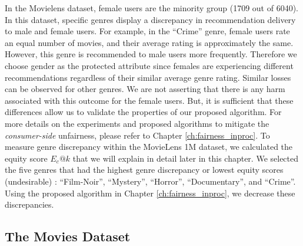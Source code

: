 
            In the Movielens dataset, female users are the minority group (1709 out of 6040). In this dataset, specific genres display a discrepancy in recommendation delivery to male and female users. For example, in the ``Crime'' genre, female users rate an equal number of movies, and their average rating is approximately the same. However, this genre is recommended to male users more frequently. Therefore we choose gender as the protected attribute since females are experiencing different recommendations regardless of their similar average genre rating. Similar losses can be observed for other genres. We are not asserting that there is any harm associated with this outcome for the female users. But, it is sufficient that these differences allow us to validate the properties of our proposed algorithm. For more details on the experiments and proposed algorithms to mitigate the \textit{consumer-side} unfairness, please refer to Chapter \ref{ch:fairness_inproc}. To measure genre discrepancy within the MovieLens 1M dataset, we calculated the equity score $E_c@k$ that we will explain in detail later in this chapter. We selected the five genres that had the highest genre discrepancy or lowest equity scores (undesirable) : ``Film-Noir'', ``Mystery'', ``Horror'', ``Documentary'', and ``Crime''. Using the proposed algorithm in Chapter \ref{ch:fairness_inproc}, we decrease these discrepancies.
            

    \subsection{The Movies Dataset}
    
